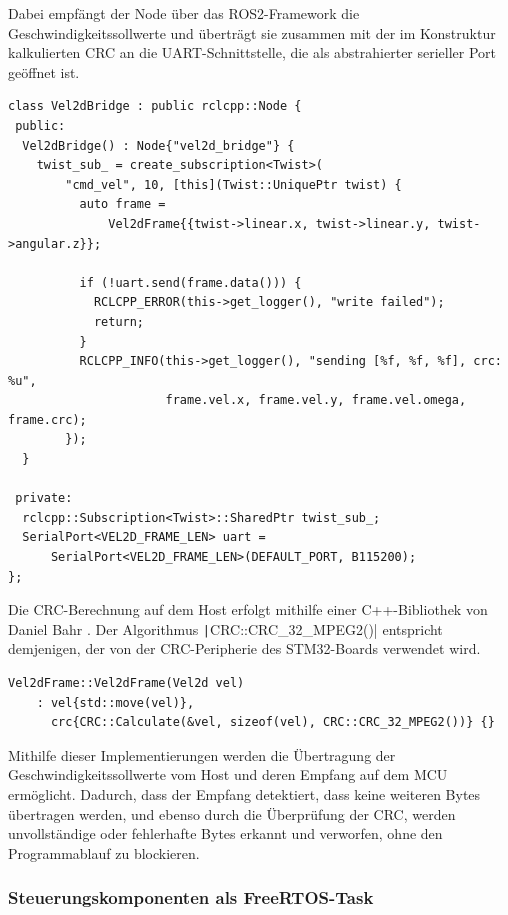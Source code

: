 Dabei empfängt der Node über das ROS2-Framework die Geschwindigkeitssollwerte
und überträgt sie zusammen mit der im Konstruktur kalkulierten CRC an die
UART-Schnittstelle, die als abstrahierter serieller Port geöffnet ist.

\begin{code}
\begin{verbatim}
class Vel2dBridge : public rclcpp::Node {
 public:
  Vel2dBridge() : Node{"vel2d_bridge"} {
    twist_sub_ = create_subscription<Twist>(
        "cmd_vel", 10, [this](Twist::UniquePtr twist) {
          auto frame =
              Vel2dFrame{{twist->linear.x, twist->linear.y, twist->angular.z}};

          if (!uart.send(frame.data())) {
            RCLCPP_ERROR(this->get_logger(), "write failed");
            return;
          }
          RCLCPP_INFO(this->get_logger(), "sending [%f, %f, %f], crc: %u",
                      frame.vel.x, frame.vel.y, frame.vel.omega, frame.crc);
        });
  }

 private:
  rclcpp::Subscription<Twist>::SharedPtr twist_sub_;
  SerialPort<VEL2D_FRAME_LEN> uart =
      SerialPort<VEL2D_FRAME_LEN>(DEFAULT_PORT, B115200);
};
\end{verbatim}
\end{code}

Die CRC-Berechnung auf dem Host erfolgt mithilfe einer C++-Bibliothek von Daniel
Bahr \cite{CRCpp}. Der Algorithmus \texttt|CRC::CRC_32_MPEG2()|
entspricht demjenigen, der von der CRC-Peripherie des STM32-Boards verwendet
wird.

\begin{code}
\begin{verbatim}
Vel2dFrame::Vel2dFrame(Vel2d vel)
    : vel{std::move(vel)},
      crc{CRC::Calculate(&vel, sizeof(vel), CRC::CRC_32_MPEG2())} {}
\end{verbatim}
\end{code}

Mithilfe dieser Implementierungen werden die Übertragung der
Geschwindigkeitssollwerte vom Host und deren Empfang auf dem MCU ermöglicht.
Dadurch, dass der Empfang detektiert, dass keine weiteren Bytes übertragen
werden, und ebenso durch die Überprüfung der CRC, werden unvollständige oder
fehlerhafte Bytes erkannt und verworfen, ohne den Programmablauf zu blockieren.

\subsubsection{Steuerungskomponenten als FreeRTOS-Task}


